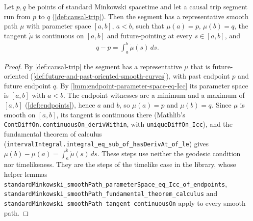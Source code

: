 \begin{lemma}
    \label{lmm:causal-trip-segment-displacement}
    \leanok
    Let $p, q$ be points of standard Minkowski spacetime and let a causal trip segment run from $p$ to $q$ (\ref{def:causal-trip}). Then the segment has a representative smooth path $\mu$ with parameter space $[a,b]$, $a < b$, such that $\mu(a) = p$, $\mu(b) = q$, the tangent $\dot\mu$ is continuous on $[a,b]$ and future-pointing at every $s \in [a,b]$, and
    \begin{align}
        q - p = \int_a^b \dot\mu(s)\,ds.
    \end{align}
\end{lemma}
\begin{proof}
    \leanok
    By \ref{def:causal-trip} the segment has a representative $\mu$ that is future-oriented (\ref{def:future-and-past-oriented-smooth-curves}), with past endpoint $p$ and future endpoint $q$. By \ref{lmm:endpoint-parameter-space-eq-Icc} its parameter space is $[a,b]$ with $a < b$. The endpoint witnesses are a minimum and a maximum of $[a,b]$ (\ref{def:endpoints}), hence $a$ and $b$, so $\mu(a) = p$ and $\mu(b) = q$. Since $\mu$ is smooth on $[a,b]$, its tangent is continuous there (Mathlib's \texttt{ContDiffOn.continuousOn\_derivWithin}, with \texttt{uniqueDiffOn\_Icc}), and the fundamental theorem of calculus (\texttt{intervalIntegral.integral\_eq\_sub\_of\_hasDerivAt\_of\_le}) gives $\mu(b) - \mu(a) = \int_a^b \dot\mu(s)\,ds$. These steps use neither the geodesic condition nor timelikeness. They are the steps of the timelike case in the library, whose helper lemmas \texttt{standardMinkowski\_smoothPath\_parameterSpace\_eq\_Icc\_of\_endpoints}, \texttt{standardMinkowski\_smoothPath\_fundamental\_theorem\_calculus} and \texttt{standardMinkowski\_smoothPath\_tangent\_continuousOn} apply to every smooth path.
\end{proof}

